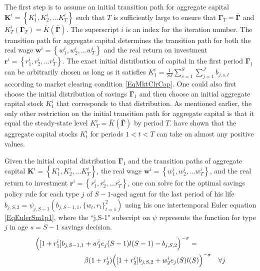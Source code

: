 \documentclass[letterpaper,12pt]{article}
\theoremstyle{definition}
\begin{document}
  The first step is to assume an initial transition path for aggregate capital $\mathbf{K}^i = \left\{K_1^i,K_2^i,...K_T^i\right\}$ such that $T$ is sufficiently large to ensure that $\bm{\Gamma}_T = \bar{\bm{\Gamma}}$ and $K_T^i\left(\bm{\Gamma}_T\right) = \bar{K}\left(\bar{\bm{\Gamma}}\right)$. The superscript $i$ is an index for the iteration number. The transition path for aggregate capital determines the transition path for both the real wage $\bm{w}^i = \left\{w_1^i,w_2^i,...w_T^i\right\}$ and the real return on investment $\bm{r}^i = \left\{r_1^i,r_2^i,...r_T^i\right\}$. The exact initial distribution of capital in the first period $\bm{\Gamma}_1$ can be arbitrarily chosen as long as it satisfies $K_1^i = \frac{1}{SJ}\sum_{s=1}^{S}\sum_{j=1}^{J}b_{j,s,t}$ according to market clearing condition \eqref{EqMktClrCap}. One could also first choose the initial distribution of savings $\bm{\Gamma}_1$ and then choose an initial aggregate capital stock $K_1^i$ that corresponds to that distribution. As mentioned earlier, the only other restriction on the initial transition path for aggregate capital is that it equal the steady-state level $K_T^i = \bar{K}\left(\bar{\bm{\Gamma}}\right)$ by period $T$. \citet{EvansPhillips:2014} have shown that the aggregate capital stocks $K_t^i$ for periods $1<t<T$ can take on almost any positive values.

  Given the initial capital distribution $\bm{\Gamma}_1$ and the transition paths of aggregate capital $\bm{K}^i = \left\{K_1^i,K_2^i,...K_T^i\right\}$, the real wage $\bm{w}^i = \left\{w_1^i,w_2^i,...w_T^i\right\}$, and the real return to investment $\bm{r}^i = \left\{r_1^i,r_2^i,...r_T^i\right\}$, one can solve for the optimal savings policy rule for each type $j$ of $S-1$-aged agent for the last period of his life $b_{j,S,2} = \psi_{j,S-1}(b_{j,S-1,1},\{w_t,r_t\}_{t=1}^2)$ using his one intertemporal Euler equation \eqref{EqEulerSm1p1}, where the ``j,S-1" subscript on $\psi$ represents the function for type $j$ in age $s=S-1$ savings decision.
  \begin{equation}\label{EqEulerSm1p1}
    \begin{split}
      &\Bigl([1+r_1^i]b_{j,S-1,1} + w_1^i e_j(S-1)l(S-1) - b_{j,S,2}\Bigr)^{-\sigma} = \\
      &\quad\quad\quad\quad\quad\quad\quad \beta(1+r_2^i)\Bigl([1+r_2^i]b_{j,S,2} + w_2^i e_j(S)l(S)\Bigr)^{-\sigma} \quad\forall j
    \end{split}
  \end{equation}
\end{document}
